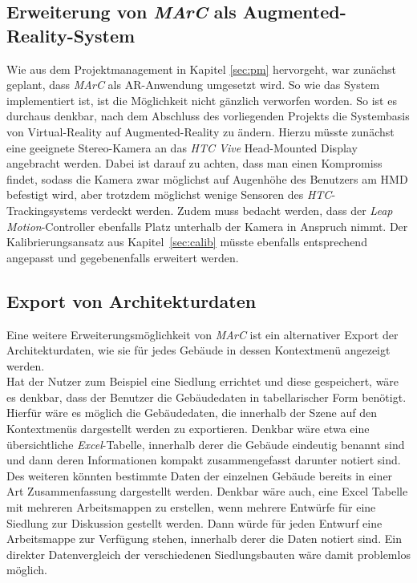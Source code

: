 \subsection{Erweiterung von \emph{MArC} als Augmented-Reality-System} \label{sec:PlanedWebcam}
Wie aus dem Projektmanagement in Kapitel \ref{sec:pm} hervorgeht, war zunächst geplant, dass \textit{MArC} als AR-Anwendung umgesetzt wird. So wie das System implementiert ist, ist die Möglichkeit nicht gänzlich verworfen worden. So ist es durchaus denkbar, nach dem Abschluss des vorliegenden Projekts die Systembasis von Virtual-Reality auf Augmented-Reality zu ändern. Hierzu müsste zunächst eine geeignete Stereo-Kamera an das \textit{HTC Vive} Head-Mounted Display angebracht werden. Dabei ist darauf zu achten, dass man einen Kompromiss findet, sodass die Kamera zwar möglichst auf Augenhöhe des Benutzers am HMD befestigt wird, aber trotzdem möglichst wenige Sensoren des \emph{HTC}-Trackingsystems verdeckt werden. Zudem muss bedacht werden, dass der \textit{Leap Motion}-Controller ebenfalls Platz unterhalb der Kamera in Anspruch nimmt. Der Kalibrierungsansatz aus Kapitel~\ref{sec:calib} müsste ebenfalls entsprechend angepasst und gegebenenfalls erweitert werden. 

\subsection{Export von Architekturdaten}
Eine weitere Erweiterungsmöglichkeit von \emph{MArC} ist ein alternativer Export der Architekturdaten, wie sie für jedes Gebäude in dessen Kontextmenü angezeigt werden.\\
Hat der Nutzer zum Beispiel eine Siedlung errichtet und diese gespeichert, wäre es denkbar, dass der Benutzer die Gebäudedaten in tabellarischer Form benötigt. Hierfür wäre es möglich die Gebäudedaten, die innerhalb der Szene auf den Kontextmenüs dargestellt werden zu exportieren. Denkbar wäre etwa eine übersichtliche \emph{Excel}-Tabelle, innerhalb derer die Gebäude eindeutig benannt sind und dann deren Informationen kompakt zusammengefasst darunter notiert sind. Des weiteren könnten bestimmte Daten der einzelnen Gebäude bereits in einer Art Zusammenfassung dargestellt werden. Denkbar wäre auch, eine Excel Tabelle mit mehreren Arbeitsmappen zu erstellen, wenn mehrere Entwürfe für eine Siedlung zur Diskussion gestellt werden. Dann würde für jeden Entwurf eine Arbeitsmappe zur Verfügung stehen, innerhalb derer die Daten notiert sind. Ein direkter Datenvergleich der verschiedenen Siedlungsbauten wäre damit problemlos möglich.

